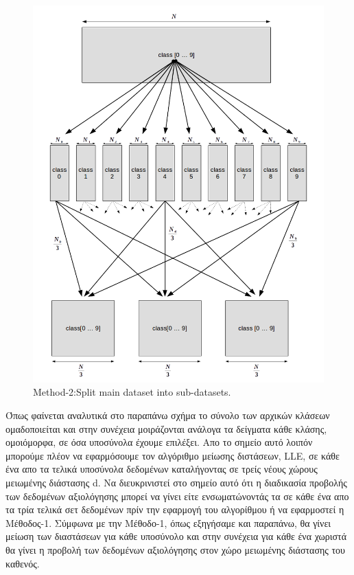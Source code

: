 \newpage
\begin{figure}[t!]
\centering
\includegraphics[scale=0.8]{figs/6.png}
\newline
\caption{ \textlatin{Method-2:Split main dataset into sub-datasets}.} 
\end{figure}
\newpage
\par
Όπως φαίνεται αναλυτικά στο παραπάνω σχήμα το σύνολο των αρχικών κλάσεων ομαδοποιείται και στην συνέχεια μοιράζονται ανάλογα τα δείγματα κάθε κλάσης, ομοιόμορφα, σε όσα υποσύνολα έχουμε επιλέξει. Απο το σημείο αυτό λοιπόν μπορούμε πλέον να εφαρμόσουμε τον αλγόριθμο μείωσης διστάσεων, \textlatin{LLE}, σε κάθε ένα απο τα τελικά υποσύνολα δεδομένων καταλήγοντας σε τρείς νέους χώρους μειωμένης διάστασης \textlatin{d}. Να διευκρινιστεί στο σημείο αυτό ότι η διαδικασία προβολής των δεδομένων αξιολόγησης μπορεί να γίνει είτε ενσωματώνοντάς τα σε κάθε ένα απο τα τρία τελικά σετ δεδομένων πρίν την εφαρμογή του αλγορίθμου ή να εφαρμοστεί η Μέθοδος-1. Σύμφωνα με την Μέθοδο-1, όπως εξηγήσαμε και παραπάνω, θα γίνει μείωση των διαστάσεων για κάθε υποσύνολο και στην συνέχεια για κάθε ένα χωριστά θα γίνει η προβολή των δεδομένων αξιολόγησης στον χώρο μειωμένης διάστασης του καθενός. 

